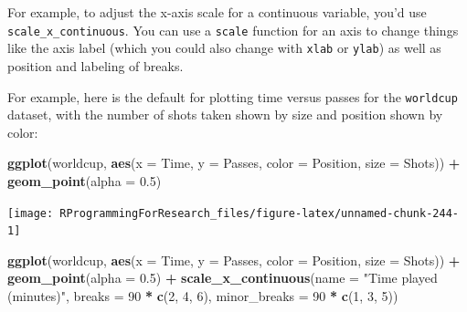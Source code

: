 \documentclass[]{book}
\makeatletter
\newenvironment{Shaded}{\begin{snugshade}}{\end{snugshade}}
\newcommand{\KeywordTok}[1]{\textcolor[rgb]{0.13,0.29,0.53}{\textbf{#1}}}
\newcommand{\DataTypeTok}[1]{\textcolor[rgb]{0.13,0.29,0.53}{#1}}
\newcommand{\DecValTok}[1]{\textcolor[rgb]{0.00,0.00,0.81}{#1}}
\newcommand{\FloatTok}[1]{\textcolor[rgb]{0.00,0.00,0.81}{#1}}
\newcommand{\StringTok}[1]{\textcolor[rgb]{0.31,0.60,0.02}{#1}}
\newcommand{\OperatorTok}[1]{\textcolor[rgb]{0.81,0.36,0.00}{\textbf{#1}}}
\newcommand{\NormalTok}[1]{#1}
\newenvironment{kframe}{%
\medskip{}
\setlength{\fboxsep}{.8em}
 \def\at@end@of@kframe{}%
 \ifinner\ifhmode%
  \def\at@end@of@kframe{\end{minipage}}%
  \begin{minipage}{\columnwidth}%
 \fi\fi%
 \def\FrameCommand##1{\hskip\@totalleftmargin \hskip-\fboxsep
 \colorbox{shadecolor}{##1}\hskip-\fboxsep
     \hskip-\linewidth \hskip-\@totalleftmargin \hskip\columnwidth}%
 \MakeFramed {\advance\hsize-\width
   \@totalleftmargin\z@ \linewidth\hsize
   \@setminipage}}%
 {\par\unskip\endMakeFramed%
 \at@end@of@kframe}
\renewenvironment{Shaded}{\begin{kframe}}{\end{kframe}}
\theoremstyle{definition}
\theoremstyle{definition}
\theoremstyle{definition}
\theoremstyle{remark}
\makeatother
\begin{document}
For example, to adjust the x-axis scale for a continuous variable, you'd
use \texttt{scale\_x\_continuous}. You can use a \texttt{scale} function
for an axis to change things like the axis label (which you could also
change with \texttt{xlab} or \texttt{ylab}) as well as position and
labeling of breaks.

For example, here is the default for plotting time versus passes for the
\texttt{worldcup} dataset, with the number of shots taken shown by size
and position shown by color:

\begin{Shaded}
\begin{Highlighting}[]
\KeywordTok{ggplot}\NormalTok{(worldcup, }\KeywordTok{aes}\NormalTok{(}\DataTypeTok{x =}\NormalTok{ Time, }\DataTypeTok{y =}\NormalTok{ Passes,}
                     \DataTypeTok{color =}\NormalTok{ Position, }\DataTypeTok{size =}\NormalTok{ Shots)) }\OperatorTok{+}\StringTok{ }
\StringTok{  }\KeywordTok{geom_point}\NormalTok{(}\DataTypeTok{alpha =} \FloatTok{0.5}\NormalTok{)}
\end{Highlighting}
\end{Shaded}

\begin{center}\texttt{[image: RProgrammingForResearch\_files/figure-latex/unnamed-chunk-244-1]} \end{center}

\begin{Shaded}
\begin{Highlighting}[]
\KeywordTok{ggplot}\NormalTok{(worldcup, }\KeywordTok{aes}\NormalTok{(}\DataTypeTok{x =}\NormalTok{ Time, }\DataTypeTok{y =}\NormalTok{ Passes,}
                     \DataTypeTok{color =}\NormalTok{ Position, }\DataTypeTok{size =}\NormalTok{ Shots)) }\OperatorTok{+}\StringTok{ }
\StringTok{  }\KeywordTok{geom_point}\NormalTok{(}\DataTypeTok{alpha =} \FloatTok{0.5}\NormalTok{) }\OperatorTok{+}\StringTok{ }
\StringTok{  }\KeywordTok{scale_x_continuous}\NormalTok{(}\DataTypeTok{name =} \StringTok{"Time played (minutes)"}\NormalTok{, }
                     \DataTypeTok{breaks =} \DecValTok{90} \OperatorTok{*}\StringTok{ }\KeywordTok{c}\NormalTok{(}\DecValTok{2}\NormalTok{, }\DecValTok{4}\NormalTok{, }\DecValTok{6}\NormalTok{),}
                     \DataTypeTok{minor_breaks =} \DecValTok{90} \OperatorTok{*}\StringTok{ }\KeywordTok{c}\NormalTok{(}\DecValTok{1}\NormalTok{, }\DecValTok{3}\NormalTok{, }\DecValTok{5}\NormalTok{))}
\end{Highlighting}
\end{Shaded}
\end{document}
